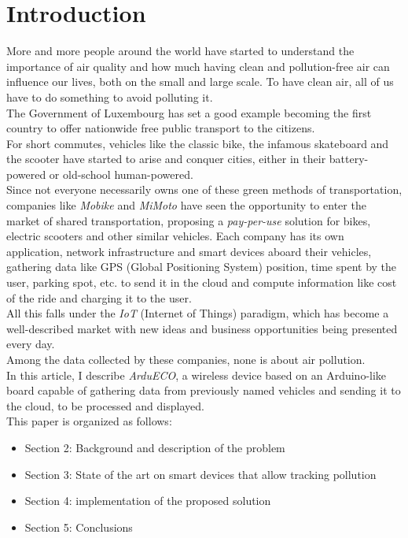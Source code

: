 \documentclass[conference]{IEEEtran}
\begin{document}
\section{Introduction}\label{intro}
	More and more people around the world have started to understand the importance of air quality and how much having clean and pollution-free air can influence our lives, both on the small and large scale. 
	To have clean air, all of us have to do something to avoid polluting it. \\
	The Government of Luxembourg has set a good example becoming the first country to offer nationwide free public transport to the citizens\cite{luxemburg}.\\
	For short commutes, vehicles like the classic bike\cite{bike}, the infamous skateboard and the scooter have started to arise and conquer cities, either in their battery-powered or old-school human-powered.\\
	Since not everyone necessarily owns one of these green methods of transportation, companies like \textit{Mobike}\cite{mobike} and \textit{MiMoto}\cite{mimoto} have seen the opportunity to enter the market of shared transportation, proposing a \textit{pay-per-use} solution for bikes, electric scooters and other similar vehicles.	
	Each company has its own application, network infrastructure and smart devices aboard their vehicles, gathering data like GPS (Global Positioning System) position, time spent by the user, parking spot, etc. to send it in the cloud and compute information like cost of the ride and charging it to the user.\\
	All this falls under the \textit{IoT} (Internet of Things) paradigm, which has become a well-described market with new ideas and business opportunities being presented every day.\\
	Among the data collected by these companies, none is about air pollution.\\
	In this article, I describe \textit{ArduECO}, a wireless device based on an Arduino-like board capable of gathering data from previously named vehicles and sending it to the cloud, to be processed and displayed.\\
	This paper is organized as follows:
	\begin{itemize}
		\item Section 2: Background and description of the problem
		\item Section 3: State of the art on smart devices that allow tracking pollution
		\item Section 4: implementation of the proposed solution
		\item Section 5: Conclusions
	\end{itemize}
\end{document}
